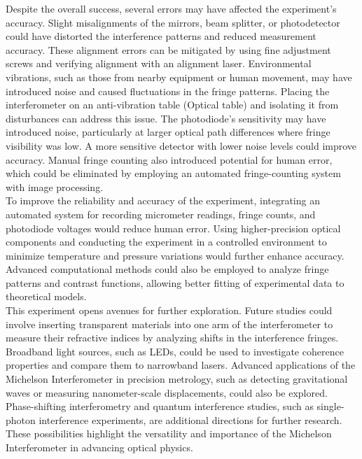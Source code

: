 \documentclass[a4paper,11pt]{article}
\begin{document}
Despite the overall success, several errors may have affected the experiment's accuracy. Slight misalignments of the mirrors, beam splitter, or photodetector could have distorted the interference patterns and reduced measurement accuracy. These alignment errors can be mitigated by using fine adjustment screws and verifying alignment with an alignment laser. Environmental vibrations, such as those from nearby equipment or human movement, may have introduced noise and caused fluctuations in the fringe patterns. Placing the interferometer on an anti-vibration table (Optical table) and isolating it from disturbances can address this issue. The photodiode’s sensitivity may have introduced noise, particularly at larger optical path differences where fringe visibility was low. A more sensitive detector with lower noise levels could improve accuracy. Manual fringe counting also introduced potential for human error, which could be eliminated by employing an automated fringe-counting system with image processing.\\

To improve the reliability and accuracy of the experiment, integrating an automated system for recording micrometer readings, fringe counts, and photodiode voltages would reduce human error. Using higher-precision optical components and conducting the experiment in a controlled environment to minimize temperature and pressure variations would further enhance accuracy. Advanced computational methods could also be employed to analyze fringe patterns and contrast functions, allowing better fitting of experimental data to theoretical models.\\

This experiment opens avenues for further exploration. Future studies could involve inserting transparent materials into one arm of the interferometer to measure their refractive indices by analyzing shifts in the interference fringes. Broadband light sources, such as LEDs, could be used to investigate coherence properties and compare them to narrowband lasers. Advanced applications of the Michelson Interferometer in precision metrology, such as detecting gravitational waves \autocite{michelson_interferometer_wikipedia} or measuring nanometer-scale displacements, could also be explored. Phase-shifting interferometry and quantum interference studies, such as single-photon interference experiments, are additional directions for further research. These possibilities highlight the versatility and importance of the Michelson Interferometer in advancing optical physics.
\end{document}
